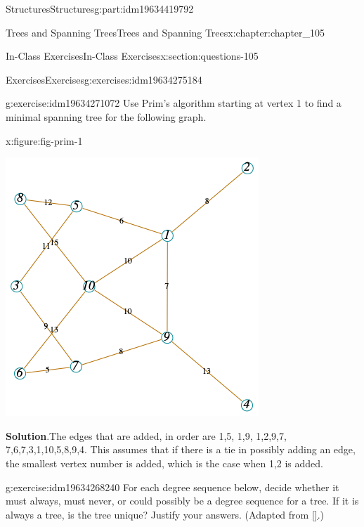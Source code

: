 \documentclass[oneside,10pt,]{book}
\newcommand{\blocktitlefont}{\relax}
\newcommand{\xreffont}{\relax}
\numberwithin{equation}{section}
\begin{document}
\begin{partptx}{Structures}{}{Structures}{}{}{g:part:idm19634419792}
\begin{chapterptx}{Trees and Spanning Trees}{}{Trees and Spanning Trees}{}{}{x:chapter:chapter_105}
\begin{sectionptx}{In-Class Exercises}{}{In-Class Exercises}{}{}{x:section:questions-105}
\begin{exercises-subsection-numberless}{Exercises}{}{Exercises}{}{}{g:exercises:idm19634275184}
\begin{exercisegroup}
\begin{divisionexerciseeg}{4}{}{}{g:exercise:idm19634271072}
Use Prim's algorithm starting at vertex 1 to find a minimal spanning tree for the following graph.%
\begin{figureptx}{}{x:figure:fig-prim-1}{}%
\begin{image}{0.175}{0.65}{0.175}%
\includegraphics[width=\linewidth]{images/fig-prim-1.png}
\end{image}%
\tcblower
\end{figureptx}%
\par\smallskip%
\noindent\textbf{\blocktitlefont Solution}.\hypertarget{g:solution:idm19634268864}{}\quad{}The edges that are added, in order are \textbraceleft{}1,5\textbraceright{}, \textbraceleft{}1,9\textbraceright{}, \textbraceleft{}1,2\textbraceright{},\textbraceleft{}9,7\textbraceright{}, \textbraceleft{}7,6\textbraceright{},\textbraceleft{}7,3\textbraceright{},\textbraceleft{}1,10\textbraceright{},\textbraceleft{}5,8\textbraceright{},\textbraceleft{}9,4\textbraceright{}.  This assumes that if there is a tie in possibly adding an edge, the smallest vertex number is added, which is the case when \textbraceleft{}1,2\textbraceright{} is added.%
\end{divisionexerciseeg}%
\begin{divisionexerciseeg}{5}{}{}{g:exercise:idm19634268240}%
For each degree sequence below, decide whether it must always, must never, or could possibly be a degree sequence for a tree.  If it is always a tree, is the tree unique?  Justify your answers. (Adapted from \hyperlink{x:biblio:biblio-levin-2020}{[{\xreffont 3}]}.)%

\end{divisionexerciseeg}
\end{exercisegroup}
\end{exercises-subsection-numberless}
\end{sectionptx}
\end{chapterptx}
\end{partptx}
\end{document}
